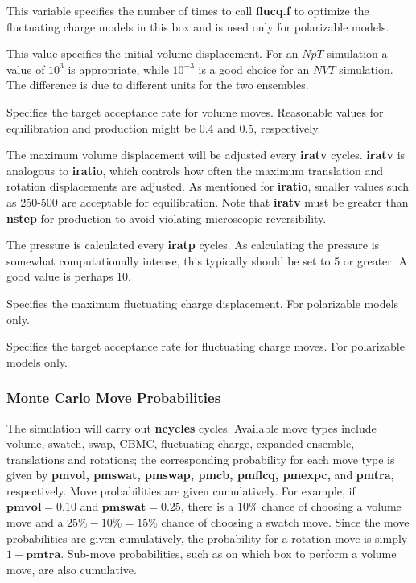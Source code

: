 \documentclass[12pt,letterpaper]{article}
\begin{document}



 This variable specifies the number of times to call {\textbf
{flucq.f}} to optimize the fluctuating charge models in this box and is used only for
polarizable models.

 This value specifies the initial volume displacement. 
For an $NpT$ simulation a value of $10^3$ is appropriate, while $10^{-3}$ is a good choice
for an $NVT$ simulation.
The difference is due to different units for the two ensembles.


 Specifies the target acceptance rate for volume
moves.  Reasonable values for equilibration and production might be 0.4 and 0.5, 
respectively.

 The maximum volume displacement will be adjusted every 
{\textbf{iratv}} cycles.  {\textbf{iratv}} is analogous to {\textbf {iratio}}, which controls how often
the maximum translation and rotation displacements are adjusted.
As mentioned for {\textbf{iratio}}, smaller values such as 250-500 are acceptable for
equilibration. 
Note that {\textbf{iratv}} must be greater than {\textbf{nstep}} for production to avoid
violating microscopic reversibility.

 The pressure is calculated every {\textbf{iratp}} cycles.
As calculating the pressure is somewhat computationally
intense, this typically should be set to 5 or greater.  A good value is perhaps 10.

 Specifies the maximum fluctuating charge displacement.  
For polarizable models only.

 Specifies the target acceptance rate for fluctuating charge moves.  
For polarizable models only.

\subsubsection{Monte Carlo Move Probabilities}
The simulation will carry out {\textbf {ncycles}} cycles.  Available move types include
volume, swatch, swap, CBMC, fluctuating charge, expanded ensemble, translations and rotations;
the corresponding probability for each move type is given by 
{\textbf{pmvol, pmswat, pmswap, pmcb, pmflcq, pmexpc,}} and {\textbf {pmtra}}, respectively.
Move probabilities are given cumulatively.  For example, if ${\textbf{pmvol}} = 0.10$ and
${\textbf{pmswat}} = 0.25$, there is a $10\%$ chance of choosing a volume move and a $25\%-10\% = 15\%$ 
chance of choosing a swatch move.
Since the move probabilities are given cumulatively, the probability for a rotation move is simply $1 - {\textbf{pmtra}}$.
Sub-move probabilities, such as on which box to perform a volume move, are also cumulative.
\end{document}
